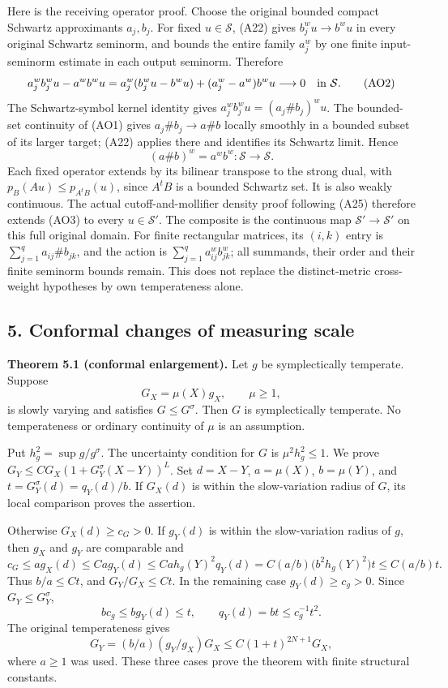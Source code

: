 \documentclass[
  11pt,
]{article}
\begin{document}
Here is the receiving operator proof. Choose the original bounded
compact Schwartz approximants \(a_j,b_j\). For fixed \(u\in\mathcal S\),
(A22) gives \(b_j^wu\to b^wu\) in every original Schwartz seminorm, and
bounds the entire family \(a_j^w\) by one finite input-seminorm estimate
in each output seminorm. Therefore \[
a_j^wb_j^wu-a^wb^wu
=a_j^w(b_j^wu-b^wu)+(a_j^w-a^w)b^wu\longrightarrow0
\quad\hbox{in }\mathcal S.
\tag{AO2}
\] The Schwartz-symbol kernel identity gives
\(a_j^wb_j^wu=(a_j\#b_j)^wu\). The bounded-set continuity of (AO1) gives
\(a_j\#b_j\to a\#b\) locally smoothly in a bounded subset of its larger
target; (A22) applies there and identifies its Schwartz limit. Hence \[
(a\#b)^w=a^wb^w:\mathcal S\longrightarrow\mathcal S.
\tag{AO3}
\] Each fixed operator extends by its bilinear transpose to the strong
dual, with \(p_B(Au)\le p_{A^tB}(u)\), since \(A^tB\) is a bounded
Schwartz set. It is also weakly continuous. The actual
cutoff-and-mollifier density proof following (A25) therefore extends
(AO3) to every \(u\in\mathcal S'\). The composite is the continuous map
\(\mathcal S'\to\mathcal S'\) on this full original domain. For finite
rectangular matrices, its \((i,k)\) entry is
\(\sum_{j=1}^q a_{ij}\#b_{jk}\), and the action is
\(\sum_{j=1}^q a_{ij}^wb_{jk}^w\); all summands, their order and their
finite seminorm bounds remain. This does not replace the distinct-metric
cross-weight hypotheses by own temperateness alone.

\subsection{5. Conformal changes of measuring
scale}\label{conformal-changes-of-measuring-scale}

\textbf{Theorem 5.1 (conformal enlargement).} Let \(g\) be
symplectically temperate. Suppose \[
G_X=\mu(X)g_X,\qquad \mu\ge1,
\tag{A26}
\] is slowly varying and satisfies \(G\le G^\sigma\). Then \(G\) is
symplectically temperate. No temperateness or ordinary continuity of
\(\mu\) is an assumption.

Put \(h_g^2=\sup g/g^\sigma\). The uncertainty condition for \(G\) is
\(\mu^2h_g^2\le1\). We prove \(G_Y\le C G_X(1+G_Y^\sigma(X-Y))^L\). Set
\(d=X-Y\), \(a=\mu(X)\), \(b=\mu(Y)\), and \(t=G_Y^\sigma(d)=q_Y(d)/b\).
If \(G_X(d)\) is within the slow-variation radius of \(G\), its local
comparison proves the assertion.

Otherwise \(G_X(d)\ge c_G>0\). If \(g_Y(d)\) is within the
slow-variation radius of \(g\), then \(g_X\) and \(g_Y\) are comparable
and \[
c_G\le a g_X(d)\le C a g_Y(d)
\le C a h_g(Y)^2q_Y(d)
=C(a/b)\big(b^2h_g(Y)^2\big)t\le C(a/b)t.
\] Thus \(b/a\le Ct\), and \(G_Y/G_X\le Ct\). In the remaining case
\(g_Y(d)\ge c_g>0\). Since \(G_Y\le G_Y^\sigma\), \[
b c_g\le b g_Y(d)\le t,\qquad q_Y(d)=bt\le c_g^{-1}t^2.
\] The original temperateness gives \[
G_Y=(b/a)(g_Y/g_X)G_X
\le C(1+t)^{2N+1}G_X,
\] where \(a\ge1\) was used. These three cases prove the theorem with
finite structural constants.
\end{document}
